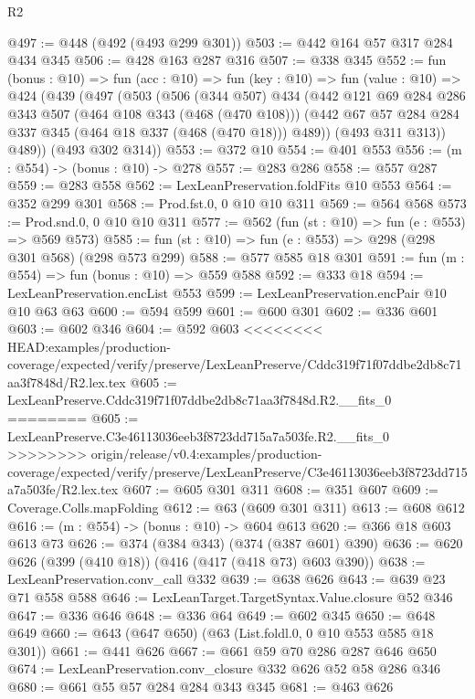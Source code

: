 \begin{lexlean}{R2}
\begin{coremodule}
{{{{{{{{{{{{{{{{{{{{{{@497 := @448 (@492 (@493 @299 @301))
@503 := @442 @164 @57 @317 @284 @434 @345
@506 := @428 @163 @287 @316
@507 := @338 @345
@552 := fun (bonus : @10) =>
  fun (acc : @10) =>
  fun (key : @10) =>
  fun (value : @10) =>
  @424
    (@439
      (@497
        (@503
          (@506
            (@344 @507)
            @434
            (@442
              @121
              @69
              @284
              @286
              @343
              @507
              (@464 @108 @343 (@468 (@470 @108)))
              (@442 @67 @57 @284 @284 @337 @345 (@464 @18 @337 (@468 (@470 @18))) @489))
            (@493 @311 @313))
          @489))
      (@493 @302 @314))
@553 := @372 @10
@554 := @401 @553
@556 := (m : @554) -> (bonus : @10) -> @278
@557 := @283 @286
@558 := @557 @287
@559 := @283 @558
@562 := LexLeanPreservation.foldFits @10 @553
@564 := @352 @299 @301
@568 := Prod.fst.{0, 0} @10 @10 @311
@569 := @564 @568
@573 := Prod.snd.{0, 0} @10 @10 @311
@577 := @562 (fun (st : @10) => fun (e : @553) => @569 @573)
@585 := fun (st : @10) => fun (e : @553) => @298 (@298 @301 @568) (@298 @573 @299)
@588 := @577 @585 @18 @301
@591 := fun (m : @554) => fun (bonus : @10) => @559 @588
@592 := @333 @18
@594 := LexLeanPreservation.encList @553
@599 := LexLeanPreservation.encPair @10 @10 @63 @63
@600 := @594 @599
@601 := @600 @301
@602 := @336 @601
@603 := @602 @346
@604 := @592 @603
<<<<<<<< HEAD:examples/production-coverage/expected/verify/preserve/LexLeanPreserve/Cddc319f71f07ddbe2db8c71aa3f7848d/R2.lex.tex
@605 := LexLeanPreserve.Cddc319f71f07ddbe2db8c71aa3f7848d.R2.__fits_0
========
@605 := LexLeanPreserve.C3e46113036eeb3f8723dd715a7a503fe.R2.__fits_0
>>>>>>>> origin/release/v0.4:examples/production-coverage/expected/verify/preserve/LexLeanPreserve/C3e46113036eeb3f8723dd715a7a503fe/R2.lex.tex
@607 := @605 @301 @311
@608 := @351 @607
@609 := Coverage.Colls.mapFolding
@612 := @63 (@609 @301 @311)
@613 := @608 @612
@616 := (m : @554) -> (bonus : @10) -> @604 @613
@620 := @366 @18 @603 @613 @73
@626 := @374 (@384 @343) (@374 (@387 @601) @390)
@636 := @620 @626 (@399 (@410 @18)) (@416 (@417 (@418 @73) @603 @390))
@638 := LexLeanPreservation.conv_call @332
@639 := @638 @626
@643 := @639 @23 @71 @558 @588
@646 := LexLeanTarget.TargetSyntax.Value.closure @52 @346
@647 := @336 @646
@648 := @336 @64
@649 := @602 @345
@650 := @648 @649
@660 := @643 (@647 @650) (@63 (List.foldl.{0, 0} @10 @553 @585 @18 @301))
@661 := @441 @626
@667 := @661 @59 @70 @286 @287 @646 @650
@674 := LexLeanPreservation.conv_closure @332 @626 @52 @58 @286 @346
@680 := @661 @55 @57 @284 @284 @343 @345
@681 := @463 @626
}}}}}}}}}}}}}}}}}}}}}}
\end{coremodule}
\end{lexlean}
